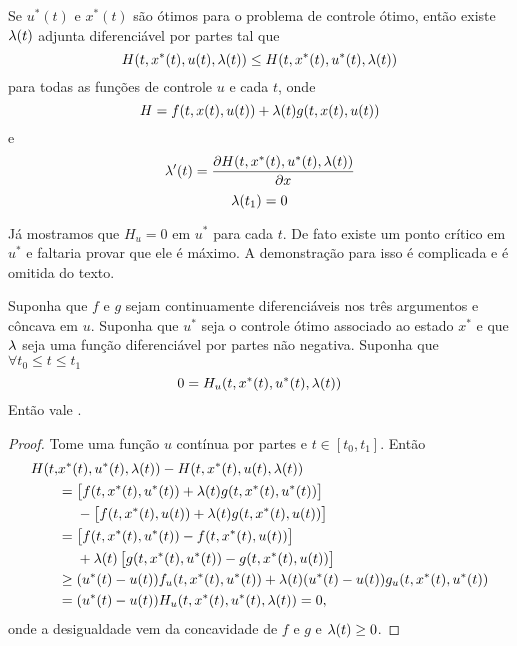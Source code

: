 \begin{theorem}
    Se $u^*(t)$ e $x^*(t)$ são ótimos para o problema de controle ótimo, então
    existe $\lambda(t)$ adjunta diferenciável por partes tal que 
    \begin{equation}
        \label{inequality-hamiltonian}
        H(t, x^*(t), u(t), \lambda(t)) \le H(t, x^*(t), u^*(t), \lambda(t))
    \end{equation}    
    para todas as funções de controle $u$ e cada $t$, onde 
    $$
    H = f(t, x(t), u(t)) + \lambda(t)g(t, x(t), u(t))
    $$
    e
    $$
    \lambda '(t) = \dfrac{\partial H(t, x^*(t), u^*(t), \lambda (t))}{\partial x} 
    $$
    $$
    \lambda(t_1) = 0
    $$
\end{theorem}  

Já mostramos que $H_u = 0$ em $u^*$ para cada $t$. De fato existe um ponto
crítico em $u^*$ e faltaria provar que ele é máximo. A demonstração para isso
é complicada e é omitida do texto. 

\begin{theorem}
    \label{theorem-inequality}
    Suponha que $f$ e $g$ sejam continuamente diferenciáveis nos três
    argumentos e côncava em $u$. Suponha que $u^*$ seja o controle ótimo
    associado ao estado $x^*$ e que $\lambda$ seja uma função diferenciável por
    partes não negativa. Suponha que $\forall t_0 \le t \le t_1$
    $$
    0 = H_u(t, x^*(t), u^*(t), \lambda(t))
    $$
    Então vale .
\end{theorem}

\begin{proof}
    Tome uma função $u$ contínua por partes e $t \in [t_0, t_1]$. Então 
    \begin{equation*}
        \begin{split}
            H(t, &x^*(t), u^*(t), \lambda(t)) - H(t, x^*(t), u(t), \lambda(t))  \\ 
            &= \left[f(t,x^*(t), u^*(t)) + \lambda(t)g(t,x^*(t), u^*(t))\right] \\
            &~~~~- \left[f(t,x^*(t), u(t)) + \lambda(t)g(t,x^*(t), u(t))\right] \\ 
            &= \left[f(t,x^*(t), u^*(t)) - f(t,x^*(t), u(t)) \right] \\
            &~~~~+ \lambda(t)\left[g(t,x^*(t), u^*(t)) - g(t,x^*(t), u(t))\right] \\
            &\ge (u^*(t) - u(t))f_u(t,x^*(t), u^*(t)) + \lambda(t)(u^*(t) - u(t))g_u(t,x^*(t),u^*(t)) \\ 
            &= (u^*(t) - u(t))H_u(t,x^*(t), u^*(t),\lambda(t)) = 0,
        \end{split}
    \end{equation*}
    onde a desigualdade vem da concavidade de $f$ e $g$ e $\lambda(t) \ge 0$. 
\end{proof}

